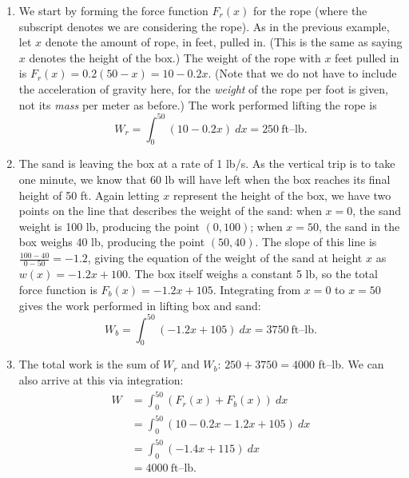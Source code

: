 {\begin{enumerate}
	\item		We start by forming the force function $F_r(x)$ for the rope (where the subscript denotes we are considering the rope). As in the previous example, let $x$ denote the amount of rope, in feet, pulled in. (This is the same as saying $x$ denotes the height of the box.) The weight of the rope with $x$ feet pulled in is $F_r(x) = 0.2(50-x) = 10-0.2x$. (Note that we do not have to include the acceleration of gravity here, for the \textit{weight} of the rope per foot is given, not its \textit{mass} per meter as before.) The work performed lifting the rope is 
	$$W_r = \int_0^{50} (10-0.2x)\ dx = 250\ \text{ft--lb}.$$
	
	\item	The sand is leaving the box at a rate of 1 lb/s. As the vertical trip is to take one minute, we know that 60 lb will have left when the box reaches its final height of 50 ft. Again letting $x$ represent the height of the box, we have two points on the line that describes the weight of the sand: when $x=0$, the sand weight is 100 lb, producing the point $(0,100)$; when $x=50$, the sand in the box weighs 40 lb, producing the point $(50,40)$. The slope of this line is $\frac{100-40}{0-50} = -1.2$, giving the equation of the weight of the sand at height $x$ as $w(x) = -1.2x+100$. The box itself weighs a constant 5 lb, so the total force function is $F_b(x) = -1.2x+105$. Integrating from $x=0$ to $x=50$ gives the work performed in lifting box and sand:
	$$W_b = \int_0^{50} (-1.2x+105)\ dx = 3750\ \text{ft--lb.}$$
	
	\item	The total work is the sum of $W_r$ and $W_b$: $250+3750=4000$ ft--lb. We can also arrive at this via integration:
	\begin{align*} W &= \int_0^{50} (F_r(x)+F_b(x))\ dx \\
									&= \int_0^{50} (10-0.2x-1.2x+105)\ dx \\
									&= \int_0^{50} (-1.4x+115) \ dx \\
									&= 4000 \ \text{ft--lb.}
	\end{align*}	
\end{enumerate}
\baselineskip
}\\


